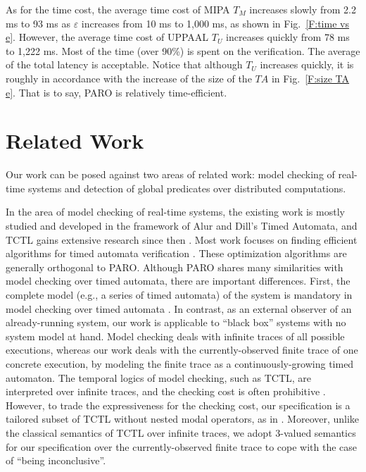 \documentclass[10pt,conference,compsocconf,letterpaper]{IEEEtran}
\begin{document}
As for the time cost, the average time cost of MIPA $T_M$ increases slowly from 2.2 ms to 93 ms as $\varepsilon$ increases from 10 ms to 1,000 ms, as shown in Fig.~\ref{F:time vs e}. However, the average time cost of UPPAAL $T_U$ increases quickly from 78 ms to 1,222 ms. Most of the time (over 90\%) is spent on the verification. The average of the total latency is acceptable. Notice that although $T_U$ increases quickly, it is roughly in accordance with the increase of the size of the $TA$ in Fig.~\ref{F:size TA e}. That is to say, \textsf{PARO} is relatively time-efficient.

\section{Related Work} \label{sec:Related work}

Our work can be posed against two areas of related work: model checking of real-time systems and detection of global predicates over distributed computations.

In the area of model checking of real-time systems, the existing work is mostly studied and developed in the framework of Alur and Dill's Timed Automata, and TCTL gains extensive research since then \cite{Baier08, Alur93, Alur94}. Most work focuses on finding efficient algorithms for timed automata verification \cite{Baier08, Dill89, Laroussinie04, Wang04}. These optimization algorithms are generally orthogonal to \textsf{PARO}. Although \textsf{PARO} shares many similarities with model checking over timed automata, there are important differences. First, the complete model (e.g., a series of timed automata) of the system is mandatory in model checking over timed automata \cite{Baier08, Alur93, Alur94}. In contrast, as an external observer of an already-running system, our work is applicable to ``black box'' systems with no system model at hand. Model checking deals with infinite traces of all possible executions, whereas our work deals with the currently-observed finite trace of one concrete execution, by modeling the finite trace as a continuously-growing timed automaton. The temporal logics of model checking, such as TCTL, are interpreted over infinite traces, and the checking cost is often prohibitive \cite{Baier08}. However, to trade the expressiveness for the checking cost, our specification is a tailored subset of TCTL without nested modal operators, as in \cite{Behrmann04}. Moreover, unlike the classical semantics of TCTL over infinite traces, we adopt 3-valued semantics for our specification over the currently-observed finite trace to cope with the case of ``being inconclusive''.
\end{document}
